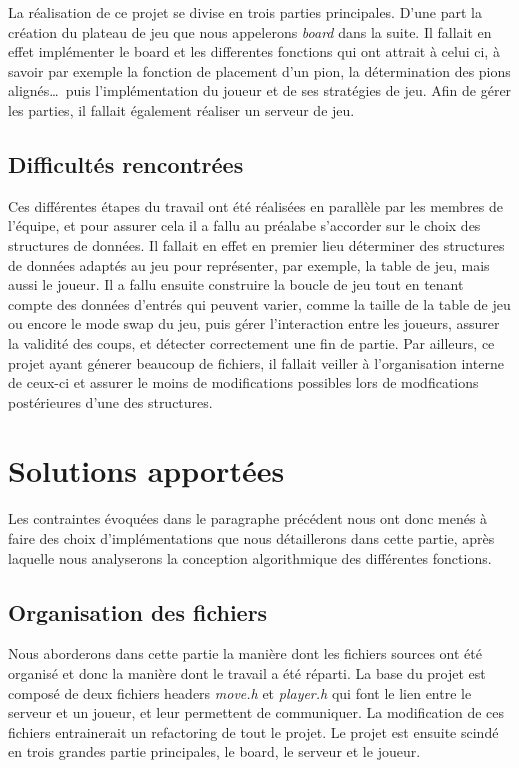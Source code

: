 \documentclass[12pt]{article}
\begin{document}
La réalisation de ce projet se divise en trois parties principales. D'une part la création du plateau de jeu  que nous appelerons \textit{board} dans la suite. Il fallait en effet implémenter le board et les differentes fonctions qui ont attrait à celui ci, à savoir par exemple la fonction de placement d'un pion, la détermination des pions alignés\dots\ puis l'implémentation du joueur et de ses stratégies de jeu. Afin de gérer les parties, il fallait également réaliser un serveur de jeu.

\subsection{Difficultés rencontrées}

Ces différentes étapes du travail ont été réalisées en parallèle par les membres de l'équipe, et pour assurer cela il a fallu au préalabe s'accorder sur le choix des structures de données. Il fallait en effet en premier lieu déterminer des structures de données adaptés au jeu pour représenter, par exemple, la table de jeu, mais aussi le joueur. Il a fallu ensuite construire la boucle de jeu tout en tenant compte des données d'entrés qui peuvent varier, comme la taille de la table de jeu ou encore le mode swap du jeu, puis gérer l'interaction entre les joueurs, assurer la validité des coups, et détecter correctement une fin de partie. Par ailleurs, ce projet ayant génerer beaucoup de fichiers, il fallait veiller à l'organisation interne de ceux-ci et assurer le moins de modifications possibles lors de modfications postérieures d'une des structures.

\section{Solutions apportées}
Les contraintes évoquées dans le paragraphe précédent nous ont donc menés à faire des choix d'implémentations que nous détaillerons dans cette partie, après laquelle nous analyserons la conception algorithmique des différentes fonctions.

\subsection{Organisation des fichiers}

Nous aborderons dans cette partie la manière dont les fichiers sources ont été organisé et donc la manière dont le travail a été réparti.
La base du projet est composé de deux fichiers headers \emph{move.h} et \emph{player.h} qui font le lien entre le serveur et un joueur, et leur permettent de communiquer. La modification de ces fichiers entrainerait un refactoring de tout le projet. Le projet est ensuite scindé en trois grandes partie principales, le board, le serveur et le joueur.
\end{document}
